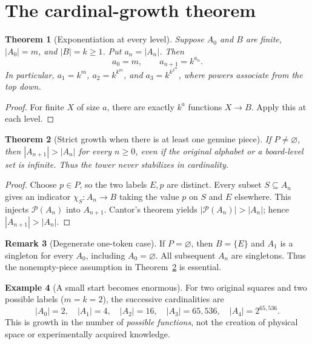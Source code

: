 \documentclass[11pt]{article}
\newtheorem{theorem}{Theorem}[section]
\theoremstyle{definition}
\newtheorem{example}[theorem]{Example}
\newtheorem{remark}[theorem]{Remark}
\newcommand{\Pow}{\mathcal P}
\begin{document}
\section{The cardinal-growth theorem}
\begin{theorem}[Exponentiation at every level]\label{thm:card}
Suppose $A_0$ and $B$ are finite, $|A_0|=m$, and $|B|=k\ge1$. Put $a_n=|A_n|$. Then
\[
\boxed{a_0=m,\qquad a_{n+1}=k^{a_n}.}
\]
In particular, $a_1=k^m$, $a_2=k^{k^m}$, and $a_3=k^{k^{k^m}}$, where powers associate from the top down.
\end{theorem}
\begin{proof}For finite $X$ of size $a$, there are exactly $k^a$ functions $X\to B$. Apply this at each level.\end{proof}
\begin{theorem}[Strict growth when there is at least one genuine piece]\label{thm:strict}
If $P\ne\varnothing$, then $|A_{n+1}|>|A_n|$ for every $n\ge0$, even if the original alphabet or a board-level set is infinite. Thus the tower never stabilizes in cardinality.
\end{theorem}
\begin{proof}Choose $p\in P$, so the two labels $E,p$ are distinct. Every subset $S\subseteq A_n$ gives an indicator $\chi_S:A_n\to B$ taking the value $p$ on $S$ and $E$ elsewhere. This injects $\Pow(A_n)$ into $A_{n+1}$. Cantor's theorem yields $|\Pow(A_n)|>|A_n|$; hence $|A_{n+1}|>|A_n|$.\end{proof}
\begin{remark}[Degenerate one-token case]
If $P=\varnothing$, then $B=\{E\}$ and $A_1$ is a singleton for every $A_0$, including $A_0=\varnothing$. All subsequent $A_n$ are singletons. Thus the nonempty-piece assumption in Theorem~\ref{thm:strict} is essential.
\end{remark}
\begin{example}[A small start becomes enormous]
For two original squares and two possible labels ($m=k=2$), the successive cardinalities are
\[
|A_0|=2,\quad |A_1|=4,\quad |A_2|=16,\quad |A_3|=65{,}536,\quad |A_4|=2^{65{,}536}.
\]
This is growth in the number of \emph{possible functions}, not the creation of physical space or experimentally acquired knowledge.
\end{example}
\end{document}
